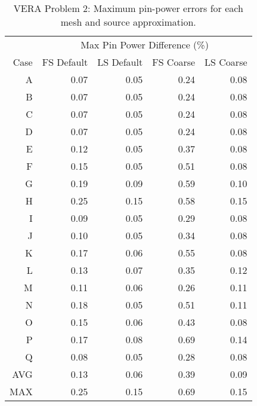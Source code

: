 {{{      \begin{table}[htbp]
        \centering
        \caption{VERA Problem 2: Maximum pin-power errors for each mesh and source approximation.\label{tab:LSMOC:Lattice:PinPower}}
        \small
        \begin{tabular}{rrrrr} \toprule
                     & \multicolumn{4}{c}{Max Pin Power Difference (\%)}\\
            Case     & FS Default & LS Default & FS Coarse & LS Coarse\\\midrule
                A    & 0.07 & 0.05 & 0.24 & 0.08\\
                B    & 0.07 & 0.05 & 0.24 & 0.08\\
                C    & 0.07 & 0.05 & 0.24 & 0.08\\
                D    & 0.07 & 0.05 & 0.24 & 0.08\\
                E    & 0.12 & 0.05 & 0.37 & 0.08\\
                F    & 0.15 & 0.05 & 0.51 & 0.08\\
                G    & 0.19 & 0.09 & 0.59 & 0.10\\
                H    & 0.25 & 0.15 & 0.58 & 0.15\\
                I    & 0.09 & 0.05 & 0.29 & 0.08\\
                J    & 0.10 & 0.05 & 0.34 & 0.08\\
                K    & 0.17 & 0.06 & 0.55 & 0.08\\
                L    & 0.13 & 0.07 & 0.35 & 0.12\\
                M    & 0.11 & 0.06 & 0.26 & 0.11\\
                N    & 0.18 & 0.05 & 0.51 & 0.11\\
                O    & 0.15 & 0.06 & 0.43 & 0.08\\
                P    & 0.17 & 0.08 & 0.69 & 0.14\\
                Q    & 0.08 & 0.05 & 0.28 & 0.08\\\midrule
                AVG  & 0.13 & 0.06 & 0.39 & 0.09\\
                MAX  & 0.25 & 0.15 & 0.69 & 0.15\\\bottomrule
        \end{tabular}
      \end{table}

}}}
